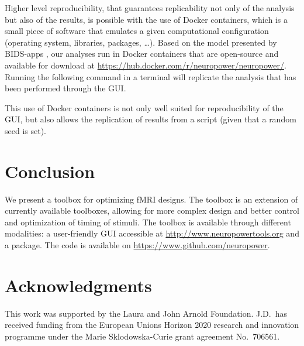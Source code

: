 \documentclass[article]{jss}
\begin{document}
Higher level reproducibility, that guarantees replicability not only
of the analysis but also of the results, is possible with the use of
Docker containers, which is a small piece of software that emulates a
given computational configuration (operating system, libraries,
 packages, \ldots).  Based on the model presented by
BIDS-apps \citep{Gorgolewski2016-wg}, our analyses run in Docker
containers that are open-source and available for download at
\url{https://hub.docker.com/r/neuropower/neuropower/}.  Running the
following command in a terminal will replicate the analysis that has
been performed through the GUI.
\begin{CodeChunk}
\end{CodeChunk}
%
This use of Docker containers is not only well suited for
reproducibility of the GUI, but also allows the replication of results
from a \proglang{Python} script (given that a random seed is set).

\section{Conclusion}\label{sec:conclusion}

We present a toolbox for optimizing fMRI designs.  The toolbox is an
extension of currently available toolboxes, allowing for more complex
design and better control and optimization of timing of stimuli.  The
toolbox is available through different modalities: a user-friendly GUI
accessible at \url{http://www.neuropowertools.org} and a
 package.  The code is available on
\url{https://www.github.com/neuropower}.

\section*{Acknowledgments}

This work was supported by the Laura and John Arnold Foundation.
J.D.\ has received funding from the European Unions Horizon 2020
research and innovation programme under the Marie Sklodowska-Curie
grant agreement No.~706561.


\end{document}
